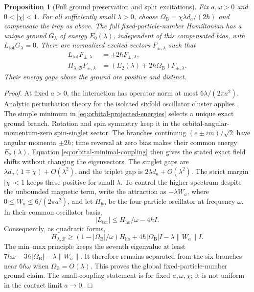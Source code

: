 \documentclass[11pt,reqno]{scrartcl}
\theoremstyle{plain}
\newtheorem{proposition}[proposition]{Proposition}
\theoremstyle{definition}
\theoremstyle{remark}
\begin{document}
\begin{proposition}[Full ground preservation and split excitations]
\label{prop:orbital-full-ground}
Fix \(a,\omega>0\) and \(0<|\chi|<1\).  For all sufficiently small
\(\lambda>0\), choose
\(\Omega_{\mathrm B}=\chi\lambda d_a/(2\hbar)\) and compensate the trap
as above.  The full fixed-particle-number Hamiltonian has a unique ground
\(G_\lambda\) of energy \(E_0(\lambda)\), independent of this
compensated bias, with
\(L_{\mathrm{tot}}G_\lambda=0\).  There are normalized excited vectors
\(F_{\pm,\lambda}\) such that
\begin{align}
 L_{\mathrm{tot}}F_{\pm,\lambda}&=\pm2\hbar F_{\pm,\lambda},\\
 H_{\lambda,\mathcal B}F_{\pm,\lambda}
   &=(E_2(\lambda)\mp2\hbar\Omega_{\mathrm B})F_{\pm,\lambda}.
\end{align}
Their energy gaps above the ground are positive and distinct.
\end{proposition}

\begin{proof}
At fixed \(a>0\), the interaction has operator norm at most
\(6\lambda/(2\pi a^2)\).  Analytic perturbation theory for the isolated
sixfold oscillator cluster applies \cite{Kato,ReedSimon}.
The simple minimum in \cref{eq:orbital-projected-energies} selects a unique
exact ground branch.  Rotation and spin symmetry keep it in the
orbital-angular-momentum-zero spin-singlet sector.  The branches continuing
\((e\pm im)/\sqrt2\) have angular momenta \(\pm2\hbar\);
time reversal at zero bias makes their common energy \(E_2(\lambda)\).
Equation \eqref{eq:orbital-minimal-coupling} then gives the stated exact
field shifts without changing the eigenvectors.  The singlet gaps are
\(\lambda d_a(1\mp\chi)+O(\lambda^2)\), and the triplet gap is
\(2\lambda d_a+O(\lambda^2)\).  The strict margin \(|\chi|<1\) keeps
these positive for small \(\lambda\).  To control the higher spectrum despite the unbounded magnetic
term, write the attraction as $-\lambda W_a$, where
$0\leq W_a\leq 6/(2\pi a^2)$, and let $H_{\mathrm{ho}}$ be the
four-particle oscillator at frequency $\omega$.  In their common
oscillator basis,
\begin{equation}
 |L_{\mathrm{tot}}|\leq H_{\mathrm{ho}}/\omega-4\hbar I.
\end{equation}
Consequently, as quadratic forms,
\begin{equation}
 H_{\lambda,\mathcal B}\geq
 (1-|\Omega_{\mathrm B}|/\omega)H_{\mathrm{ho}}
 +4\hbar|\Omega_{\mathrm B}|I-\lambda\|W_a\|I.
\end{equation}
The min--max principle keeps the seventh eigenvalue at least
$7\hbar\omega-3\hbar|\Omega_{\mathrm B}|-\lambda\|W_a\|$.
It therefore remains separated from the six branches near
$6\hbar\omega$ when $\Omega_{\mathrm B}=O(\lambda)$.  This proves
the global fixed-particle-number ground claim.  The small-coupling
statement is for fixed $a,\omega,\chi$; it is not uniform in the
contact limit $a\to0$.
\end{proof}
\end{document}
